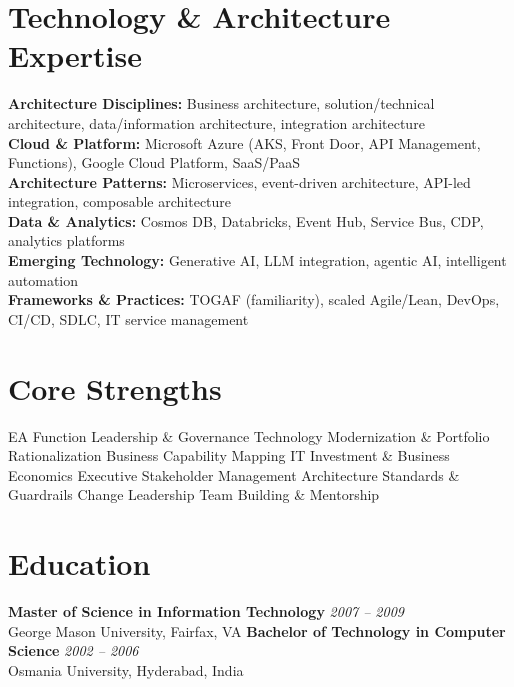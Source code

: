 \documentclass[11pt]{article}
\begin{document}
\section*{Technology \& Architecture Expertise}
\textbf{Architecture Disciplines:} Business architecture, solution/technical architecture, data/information architecture, integration architecture \\
\textbf{Cloud \& Platform:} Microsoft Azure (AKS, Front Door, API Management, Functions), Google Cloud Platform, SaaS/PaaS \\
\textbf{Architecture Patterns:} Microservices, event-driven architecture, API-led integration, composable architecture \\
\textbf{Data \& Analytics:} Cosmos DB, Databricks, Event Hub, Service Bus, CDP, analytics platforms \\
\textbf{Emerging Technology:} Generative AI, LLM integration, agentic AI, intelligent automation \\
\textbf{Frameworks \& Practices:} TOGAF (familiarity), scaled Agile/Lean, DevOps, CI/CD, SDLC, IT service management

\section*{Core Strengths}
EA Function Leadership \& Governance \textbullet{} Technology Modernization \& Portfolio Rationalization \textbullet{} Business Capability Mapping \textbullet{} IT Investment \& Business Economics \textbullet{} Executive Stakeholder Management \textbullet{} Architecture Standards \& Guardrails \textbullet{} Change Leadership \textbullet{} Team Building \& Mentorship

\section*{Education}
\textbf{Master of Science in Information Technology} \hfill \textit{2007 -- 2009} \\
George Mason University, Fairfax, VA
\newline
\textbf{Bachelor of Technology in Computer Science} \hfill \textit{2002 -- 2006} \\
Osmania University, Hyderabad, India
\end{document}
